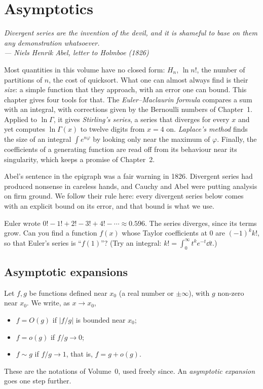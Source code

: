 \chapter{Asymptotics}

\begin{center}\itshape
Divergent series are the invention of the devil, and it is shameful to base on them any demonstration whatsoever.\\
\upshape --- Niels Henrik Abel, letter to Holmboe (1826)
\end{center}

Most quantities in this volume have no closed form: $H_n$, $\ln n!$, the number of partitions of $n$, the cost of quicksort. What one can
almost always find is their \emph{size}: a simple function that they approach, with an error one can bound. This chapter gives four tools
for that. The \emph{Euler--Maclaurin formula} compares a sum with an integral, with corrections given by the Bernoulli numbers of
Chapter~1. Applied to $\ln\Gamma$, it gives \emph{Stirling's series}, a series that diverges for every $x$ and yet computes $\ln\Gamma(x)$
to twelve digits from $x=4$ on. \emph{Laplace's method} finds the size of an integral $\int e^{n\varphi}$ by looking only near the
maximum of $\varphi$. Finally, the coefficients of a generating function are read off from its behaviour near its singularity, which keeps a
promise of Chapter~2.

Abel's sentence in the epigraph was a fair warning in 1826. Divergent series had produced nonsense in careless hands, and Cauchy and Abel
were putting analysis on firm ground. We follow their rule here: every divergent series below comes with an explicit bound on its error,
and that bound is what we use.

\begin{think}
Euler wrote $0!-1!+2!-3!+4!-\cdots\approx0.596$. The series diverges, since its terms grow. Can you find a function $f(x)$ whose
Taylor coefficients at $0$ are $(-1)^kk!$, so that Euler's series is ``$f(1)$''? (Try an integral: $k!=\int_0^\infty t^ke^{-t}\dd t$.)
\end{think}

\section{Asymptotic expansions}

Let $f,g$ be functions defined near $x_0$ (a real number or $\pm\infty$), with $g$ non-zero near $x_0$. We write, as $x\to x_0$,
\begin{itemize}
\item $f=O(g)$ if $|f/g|$ is bounded near $x_0$;
\item $f=o(g)$ if $f/g\to0$;
\item $f\sim g$ if $f/g\to1$, that is, $f=g+o(g)$.
\end{itemize}
These are the notations of Volume~0, used freely since. An \emph{asymptotic expansion} goes one step further.

